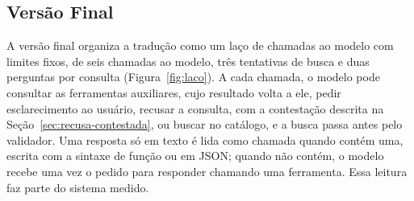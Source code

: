 \subsection{Versão Final}
\label{sec:versao-final}

A versão final organiza a tradução como um laço de chamadas ao modelo com limites fixos, de seis chamadas ao modelo, três tentativas de busca e duas perguntas por consulta (Figura~\ref{fig:laco}). A cada chamada, o modelo pode consultar as ferramentas auxiliares, cujo resultado volta a ele, pedir esclarecimento ao usuário, recusar a consulta, com a contestação descrita na Seção~\ref{sec:recusa-contestada}, ou buscar no catálogo, e a busca passa antes pelo validador. Uma resposta só em texto é lida como chamada quando contém uma, escrita com a sintaxe de função ou em JSON; quando não contém, o modelo recebe uma vez o pedido para responder chamando uma ferramenta. Essa leitura faz parte do sistema medido.

